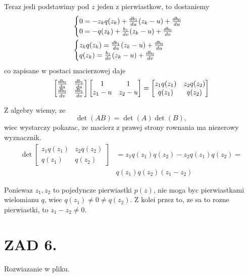 \documentclass{article}[16pt]
\begin{document}
    Teraz jesli podstawimy pod $z$ jeden z pierwiastkow, to dostaniemy
    \begin{align*}
        &\begin{cases}
            0=-z_kq(z_k)+{db_1\over du}(z_k-u)+{db_0\over du}\\
            0=-q(z_k)+{b_1\over dv}(z_k-u)+{db_0\over dv}
        \end{cases}\\
        &\begin{cases}
            z_kq(z_k)={db_1\over du}(z_k-u)+{db_0\over du}\\
            q(z_k)={b_1\over dv}(z_k-u)+{db_0\over dv}
        \end{cases}
    \end{align*}
    co zapisane w postaci macierzowej daje
    \begin{align*}
        \begin{bmatrix}
            {db_0\over du} & {db_1\over du}\\
            {db_0\over dv} & {db_1\over dv}
        \end{bmatrix}
        \begin{bmatrix}
            1 & 1\\
            z_1-u & z_2 - u
        \end{bmatrix}=
        \begin{bmatrix}
            z_1q(z_1) & z_2q(z_2)\\
            q(z_1) & q(z_2)
        \end{bmatrix}
    \end{align*}

    Z algebry wiemy, ze
    $$\det(AB)=\det(A)\det(B),$$
    wiec wystarczy pokazac, ze macierz z prawej strony rownania ma niezerowy wyznacznik.
    \begin{align*}
        \det\begin{bmatrix}
            z_1q(z_1) & z_2q(z_2)\\
            q(z_1) & q(z_2)
        \end{bmatrix}&=z_1q(z_1)q(z_2)-z_2q(z_1)q(z_2)=\\
        &q(z_1)q(z_2)(z_1-z_2)
    \end{align*}

    Poniewaz $z_1,z_2$ to pojedyncze pierwiastki $p(z)$, nie moga byc pierwiastkami wielomianu $q$, wiec $q(z_1)\neq0\neq q(z_2)$. Z kolei przez to, ze sa to rozne pierwiastki, to $z_1-z_2\neq0$.


    \section*{ZAD 6.}

    Rozwiazanie w pliku.
\end{document}
